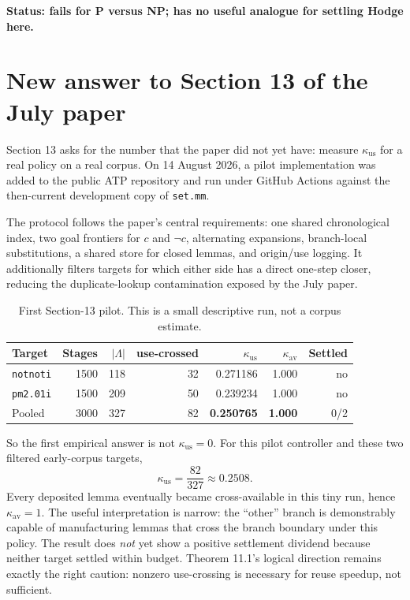 \documentclass[11pt]{article}
\newcommand{\kuse}{\kappa_{\mathrm{us}}}
\newcommand{\kav}{\kappa_{\mathrm{av}}}
\begin{document}
\textbf{Status: fails for P versus NP; has no useful analogue for settling Hodge here.}

\section{New answer to Section 13 of the July paper}

Section 13 asks for the number that the paper did not yet have: measure \(\kuse\) for a real policy on a real corpus.  On 14 August 2026, a pilot implementation was added to the public ATP repository and run under GitHub Actions against the then-current development copy of \texttt{set.mm}.

The protocol follows the paper's central requirements: one shared chronological index, two goal frontiers for \(c\) and \(\neg c\), alternating expansions, branch-local substitutions, a shared store for closed lemmas, and origin/use logging.  It additionally filters targets for which either side has a direct one-step closer, reducing the duplicate-lookup contamination exposed by the July paper.

\begin{table}[H]
\centering
\caption{First Section-13 pilot.  This is a small descriptive run, not a corpus estimate.}
\begin{tabular}{@{}lrrrrrr@{}}
\toprule
Target & Stages & \(|\Lambda|\) & use-crossed & \(\kuse\) & \(\kav\) & Settled \\
\midrule
\texttt{notnoti} & 1500 & 118 & 32 & 0.271186 & 1.000 & no \\
\texttt{pm2.01i} & 1500 & 209 & 50 & 0.239234 & 1.000 & no \\
\midrule
Pooled & 3000 & 327 & 82 & \textbf{0.250765} & \textbf{1.000} & 0/2 \\
\bottomrule
\end{tabular}
\end{table}

So the first empirical answer is not \(\kuse=0\).  For this pilot controller and these two filtered early-corpus targets,
\[
\boxed{\kuse=\frac{82}{327}\approx0.2508.}
\]
Every deposited lemma eventually became cross-available in this tiny run, hence \(\kav=1\).  The useful interpretation is narrow: the ``other'' branch is demonstrably capable of manufacturing lemmas that cross the branch boundary under this policy.  The result does \emph{not} yet show a positive settlement dividend because neither target settled within budget.  Theorem 11.1's logical direction remains exactly the right caution: nonzero use-crossing is necessary for reuse speedup, not sufficient.
\end{document}
